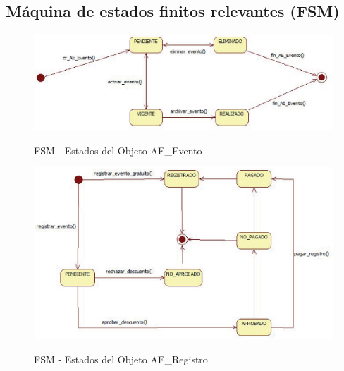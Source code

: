 \subsection{M\'aquina de estados finitos relevantes (FSM)}
\begin{indentar}

\begin{figure}
  \centering
    {\includegraphics[width=1.0\textwidth]{images/estado-evento.eps}}
  \caption{FSM - Estados del Objeto AE\_Evento}
  \label{estados:ae_evento}
\end{figure}

\begin{figure}
  \centering
    {\includegraphics[width=1.0\textwidth]{images/estado-registro.eps}}
  \caption{FSM - Estados del Objeto AE\_Registro}
  \label{estados:ae_registro}
\end{figure}

\end{indentar}

